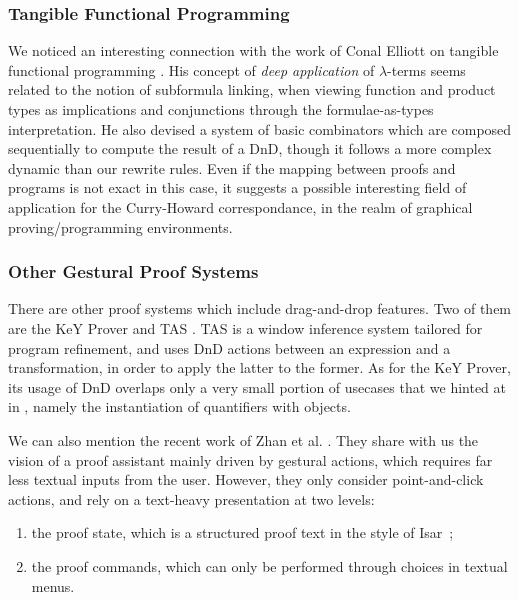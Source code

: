 \subsubsection*{Tangible Functional Programming}
We noticed an interesting connection with the work of Conal Elliott on
tangible functional programming \cite{elliott-tangible}. His concept
of \emph{deep application} of $\lambda$-terms seems related to the
notion of subformula linking, when viewing function and product types
as implications and conjunctions through the formulae-as-types
interpretation. He also devised a system of basic combinators which
are composed sequentially to compute the result of a DnD, though it
follows a more complex dynamic than our rewrite rules. Even if the
mapping between proofs and programs is not exact in this case, it
suggests a possible interesting field of application for the
Curry-Howard correspondance, in the realm of graphical
proving/programming environments.

\subsubsection*{Other Gestural Proof Systems}
There are other proof systems which include drag-and-drop features. Two of them
are the KeY Prover \cite{ahrendt-using-2016} and TAS \cite{goos-tas-2000}. TAS
is a window inference system tailored for program refinement, and uses DnD
actions between an expression and a transformation, in order to apply the latter
to the former.
As for the KeY Prover, its usage of DnD overlaps only a very small
portion of usecases that we hinted at in , namely
the instantiation of quantifiers with objects.

We can also mention the recent work of Zhan et
al. \cite{zhan-design-2019}. They share with us the vision of a proof assistant
mainly driven by gestural actions, which requires far less textual inputs from
the user. However, they only consider point-and-click actions, and rely on a
text-heavy presentation at two levels:
\begin{enumerate}
  \item the proof state, which is a structured proof text in the style of Isar~\cite{isar};
  \item the proof commands, which can only be performed through choices in textual menus.
\end{enumerate}

